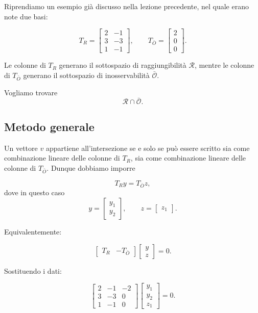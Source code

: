 Riprendiamo un esempio già discusso nella lezione precedente, nel quale erano note due basi:

\[
T_R=
\begin{bmatrix}
2 & -1\\
3 & -3\\
1 & -1
\end{bmatrix},
\qquad
T_{\bar O}=
\begin{bmatrix}
2\\
0\\
0
\end{bmatrix}.
\]

Le colonne di \(T_R\) generano il sottospazio di raggiungibilità \(\mathcal R\), mentre le colonne di \(T_{\bar O}\) generano il sottospazio di inosservabilità \(\bar{\mathcal O}\).

Vogliamo trovare
\[
\mathcal R\cap\bar{\mathcal O}.
\]

\subsection{Metodo generale}

Un vettore \(v\) appartiene all'intersezione se e solo se può essere scritto sia come combinazione lineare delle colonne di \(T_R\), sia come combinazione lineare delle colonne di \(T_{\bar O}\). Dunque dobbiamo imporre

\[
T_R y = T_{\bar O} z,
\]
dove in questo caso
\[
y=
\begin{bmatrix}
y_1\\y_2
\end{bmatrix},
\qquad
z=
\begin{bmatrix}
z_1
\end{bmatrix}.
\]

Equivalentemente:

\[
\begin{bmatrix}
T_R & -T_{\bar O}
\end{bmatrix}
\begin{bmatrix}
y\\z
\end{bmatrix}
=0.
\]

Sostituendo i dati:

\[
\begin{bmatrix}
2 & -1 & -2\\
3 & -3 & 0\\
1 & -1 & 0
\end{bmatrix}
\begin{bmatrix}
y_1\\y_2\\z_1
\end{bmatrix}
=0.
\]

